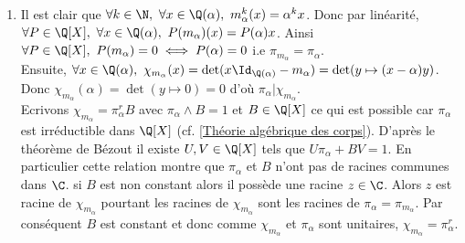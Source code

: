 \documentclass[8pt]{book}
\begin{document}
\begin{enumerate}[leftmargin=*]
		Soit $m\in \N^*$. Si $m=1$ alors toutes ses valuation $p$-adique sont nulles donc c'est bon. Supposons que $m=k^2$ pour un certain $k\geq 2$. On sait que $m=\displaystyle\prod_{p\text{ premier}}p^{v_p(m)}=\left(\prod_{p\text{ premier}}p^{v_p(k)}\right)^2=\prod_{p\text{ premier}}p^{2v_p(k)}$. Donc par unicité de la décomposition en facteurs premiers, quel que soit $p$ premier $v_p(m)=2v_p(k)$.\\
		Réciproquement si quel que soit $p$ premier il existe $k_p\in \N$ tel que $v_p(m)=2k_p$, alors $m=k^2$ avec $k=\displaystyle\prod_{p\text{ premier}}p^{k_p}\in \N^*$.\\
		On en déduit que $d$ a un diviseur premier $p$ pour lequel $v_p(d)$ est impair. De plus on sait que $v_p(a^2)$ et $v_p(b^2)$ sont pairs. Mais alors l'égalité $db^2=a^2$ qui donne $v_p(d)+v_p(b^2)=v_p(a^2)$ est absurde. Ainsi $\sqrt d\notin \Q$.\\
		Par conséquent $\pi_\alpha$ est de degré au moins $2$ et par suite comme il est unitaire, $\pi_\alpha=X^2-d$.\\
		Alors d'après la question précédente $\Q(\sqrt d)$ est un $\Q$-espace vectoriel de dimension $2$ dont une base est $(1,\sqrt d)$. Autrement dit $\Q(\sqrt d)=\{a+b\sqrt d,\ (a,b)\in \Q^2\}$.
		\item Il est clair que $\forall k\in \N,\ \forall x\in \Q(\alpha),\ m_\alpha^k(x)=\alpha^kx$. Donc par linéarité, $\forall P\in \Q[X],\ \forall x\in \Q(\alpha),\ P(m_\alpha)(x)=P(\alpha)x$. Ainsi $\forall P\in \Q[X],\ P(m_\alpha)=0\iff P(\alpha)=0$ i.e $\pi_{m_\alpha}=\pi_\alpha$.\\
		Ensuite, $\forall x\in \Q(\alpha),\ \chi_{m_\alpha}(x)=\det(x\Id_{\Q(\alpha)}-m_\alpha)=\det(y\mapsto (x-\alpha)y)$.\\
		Donc $\chi_{m_\alpha}(\alpha)=\det(y\mapsto 0)=0$ d'où $\pi_\alpha|\chi_{m_\alpha}$.\\
		Ecrivons $\chi_{m_\alpha}=\pi_\alpha^r B$ avec $\pi_\alpha\wedge B=1$ et $B\in \Q[X]$ ce qui est possible car $\pi_\alpha$ est irréductible dans $\Q[X]$ (cf. \ref{Théorie algébrique des corps}). D'après le théorème de Bézout il existe $U,V\in \Q[X]$ tels que $U\pi_\alpha+BV=1$. En particulier cette relation montre que $\pi_\alpha$ et $B$ n'ont pas de racines communes dans $\C$. 
		si $B$ est non constant alors il possède une racine $z\in \C$. Alors $z$ est racine de $\chi_{m_\alpha}$ pourtant les racines de $\chi_{m_\alpha}$ sont les racines de $\pi_\alpha=\pi_{m_\alpha}$. Par conséquent $B$ est constant et donc comme $\chi_{m_\alpha}$ et $\pi_\alpha$ sont unitaires, $\chi_{m_\alpha}=\pi_\alpha^r$.

\end{enumerate}
\end{document}
